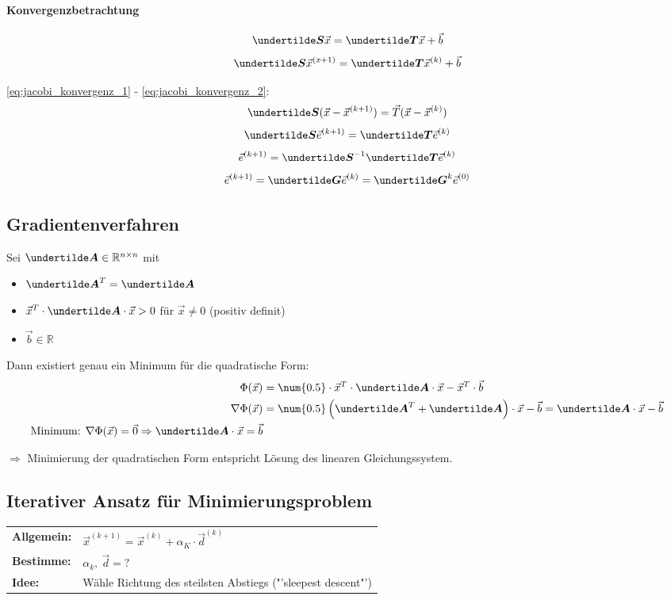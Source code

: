 \paragraph{Konvergenzbetrachtung}
\begin{equation}
	\ma{S} \vec{x} = \ma{T} \vec{x} + \vec{b}
	\label{eq:jacobi_konvergenz_1}
\end{equation}
\begin{equation}
	\ma{S} \vec{x}^{(x + 1)} = \ma{T} \vec{x}^{(k)} + \vec{b}
	\label{eq:jacobi_konvergenz_2}
\end{equation}

\ref{eq:jacobi_konvergenz_1} - \ref{eq:jacobi_konvergenz_2}:
\[\ma{S} (\vec{x} - \vec{x}^{(k + 1)}) = \vec{T} (\vec{x} - \vec{x}^{(k)})\]
\[\ma{S} \vec{e}^{(k + 1)} = \ma{T} \vec{e}^{(k)}\]
\[\vec{e}^{(k + 1)} = \ma{S}^{-1} \ma{T} \vec{e}^{(k)}\]
\[\vec{e}^{(k + 1)} = \ma{G} \vec{e}^{(k)} = \ma{G}^k \vec{e}^{(0)}\]

\subsection{Gradientenverfahren}
Sei $ \ma{A} \in \mathbb{R}^{n\times n} $ mit
\begin{itemize}
	\item $\ma{A}^T = \ma{A}$
	\item $\vec{x}^T \cdot \ma{A} \cdot \vec{x} > 0$ für $\vec{x} \neq 0$ (positiv definit)
	\item $\vec{b} \in \mathbb{R}$
\end{itemize}

Dann existiert genau ein Minimum für die quadratische Form:
\begin{align*}
	\Phi(\vec{x}) &= \num{0.5} \cdot \vec{x}^T \cdot \ma{A} \cdot \vec{x} - \vec{x}^T \cdot \vec{b}\\
	\nabla \Phi(\vec{x}) &= \num{0.5} \left( \ma{A}^T + \ma{A} \right) \cdot \vec{x} - \vec{b} = \ma{A} \cdot \vec{x} - \vec{b}\\
	\text{Minimum: } \nabla \Phi(\vec{x}) = \vec{0} \Rightarrow \ma{A} \cdot \vec{x} = \vec{b}
\end{align*}

$\Rightarrow$ Minimierung der quadratischen Form entspricht Lösung des linearen Gleichungssystem.

\subsection{Iterativer Ansatz für Minimierungsproblem}
\begin{tabular}{ll}
	\textbf{Allgemein:} & $\vec{x}^{(k+1)} = \vec{x}^{(k)} + \alpha_K \cdot \vec{d}^{(k)}$\\
	\textbf{Bestimme:} & $\alpha_k,\ \vec{d} = ?$\\
	\textbf{Idee:} & Wähle Richtung des steilsten Abstiegs ("'sleepest descent"')\\
\end{tabular}

